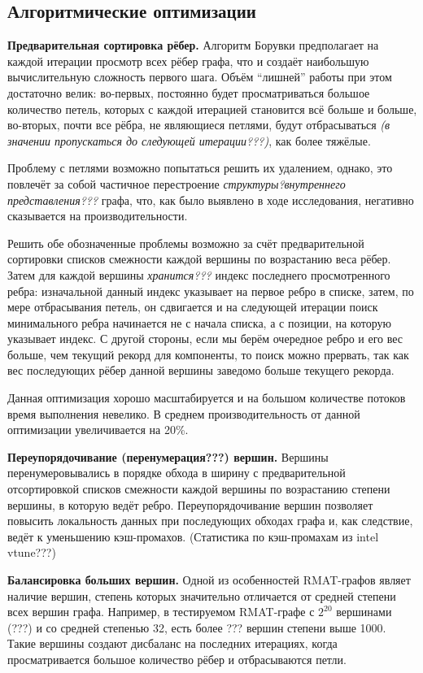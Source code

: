\documentclass{article}
\begin{document}
\subsection{Алгоритмические оптимизации}

\textbf{Предварительная сортировка рёбер.}
Алгоритм Борувки предполагает на каждой итерации просмотр всех рёбер графа, что и создаёт наибольшую вычислительную сложность первого шага.
Объём ``лишней'' работы при этом достаточно велик: во-первых, постоянно будет просматриваться большое количество петель, которых с каждой итерацией становится всё больше и больше, во-вторых, почти все рёбра, не являющиеся петлями, будут отбрасываться \textit{(в значении пропускаться до следующей итерации???)}, как более тяжёлые.


Проблему с петлями возможно попытаться решить их удалением, однако, это повлечёт за собой частичное перестроение \textit{структуры?внутреннего представления???} графа, что, как было выявлено в ходе исследования, негативно сказывается на производительности.

Решить обе обозначенные проблемы возможно за счёт предварительной сортировки списков смежности каждой вершины по возрастанию веса рёбер. Затем для каждой вершины \textit{хранится???} индекс последнего просмотренного ребра: изначальной данный индекс указывает на первое ребро в списке, затем, по мере отбрасывания петель, он сдвигается и на следующей итерации поиск минимального ребра начинается не с начала списка, а с позиции, на которую указывает индекс. С другой стороны, если мы берём очередное ребро и его вес больше, чем текущий рекорд для компоненты, то поиск можно прервать, так как вес последующих рёбер данной вершины заведомо больше текущего рекорда.

Данная оптимизация хорошо масштабируется и на большом количестве потоков время выполнения невелико. В среднем производительность от данной оптимизации увеличивается на 20\%.



\textbf{Переупорядочивание (перенумерация???) вершин.}
Вершины перенумеровывались в порядке обхода в ширину с предварительной отсортировкой списков смежности каждой вершины по возрастанию степени вершины, в которую ведёт ребро. Переупорядочивание вершин позволяет повысить локальность данных при последующих обходах графа \cite{sparse-matrix-renum} и, как следствие, ведёт к уменьшению кэш-промахов. (Статистика по кэш-промахам из intel vtune???)


\textbf{Балансировка больших вершин.}
Одной из особенностей RMAT-графов являет наличие вершин, степень которых значительно отличается от средней степени всех вершин графа. Например, в тестируемом RMAT-графе с $2^{20}$ вершинами (???) и со средней степенью 32, есть более ??? вершин степени выше 1000. Такие вершины создают дисбаланс на последних итерациях, когда просматривается большое количество рёбер и отбрасываются петли.
\end{document}
